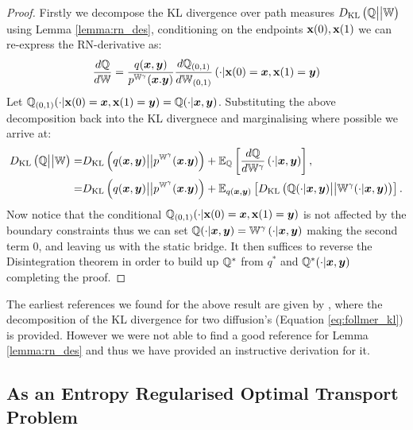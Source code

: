 \documentclass[a4paper,12pt,twoside,openright]{report}
\theoremstyle{definition}
\begin{document}
\begin{proof}
Firstly we decompose the KL divergence over path measures $D_{\mathrm{KL}}\left({\mathbb{Q}} \big|\big| \mathbb{W}\right)$ using Lemma \ref{lemma:rn_des}, conditioning on the endpoints ${\mathbf{x}}(0), {\mathbf{x}}(1)$ we can re-express the RN-derivative as:
\begin{align}
    \frac{d{\mathbb{Q}}}{d\mathbb{W}} = \frac{q({\bm{x}}, {\bm{y}})}{p^{\mathbb{W}^{\gamma}}({\bm{x}}. {\bm{y}})}\frac{d{\mathbb{Q}}_{(0,1)}}{d\mathbb{W}_{(0,1)}}\left(\cdot | {\mathbf{x}}(0) ={\bm{x}}, {\mathbf{x}}(1) ={\bm{y}}\right)
\end{align}
Let ${\mathbb{Q}}_{(0,1)}(\cdot |  {\mathbf{x}}(0) ={\bm{x}}, {\mathbf{x}}(1) ={\bm{y}}) = {\mathbb{Q}}(\cdot |  {\bm{x}},{\bm{y}})$. Substituting the above decomposition back into the KL divergnece and marginalising where possible we arrive at: 
\begin{align} \label{eq:follmer_kl}
    D_{\mathrm{KL}}\left({\mathbb{Q}} \big|\big| \mathbb{W}\right) =&  D_{\mathrm{KL}}\left(q({\bm{x}}, {\bm{y}}) \big|\big| p^{\mathbb{W}^{\gamma}}({\bm{x}}. {\bm{y}}) \right)  + \mathbb{E}_{{\mathbb{Q}}}\left[\frac{d{\mathbb{Q}}}{d\mathbb{W}^\gamma}\left(\cdot | {\bm{x}}, {\bm{y}}\right)\right], \nonumber \\
    =&  D_{\mathrm{KL}}\left(q({\bm{x}}, {\bm{y}}) \big|\big| p^{\mathbb{W}^{\gamma}}({\bm{x}}. {\bm{y}}) \right)  + \mathbb{E}_{q({\bm{x}},{\bm{y}})}\left[D_{\mathrm{KL}}\left({\mathbb{Q}}(\cdot |  {\bm{x}},{\bm{y}})\big|\big|\mathbb{W}^{\gamma}(\cdot |  {\bm{x}},{\bm{y}})\right)\right].
\end{align}
Now notice that the conditional ${\mathbb{Q}}_{(0,1)}(\cdot |  {\mathbf{x}}(0) ={\bm{x}}, {\mathbf{x}}(1) ={\bm{y}})$ is not affected by the boundary constraints thus we can set ${\mathbb{Q}}(\cdot | {\bm{x}},{\bm{y}}) = \mathbb{W}^\gamma\left(\cdot | {\bm{x}}, {\bm{y}}\right)$ making the second term 0, and leaving us with the static bridge. It then suffices to reverse the Disintegration theorem in order to build up ${\mathbb{Q}}^{*}$ from $q^{*}$ and ${\mathbb{Q}}^{*}(\cdot | {\bm{x}},{\bm{y}})$ completing the proof.
\end{proof}

The earliest references we found for the above result are given by \cite{follmer1988random}, where the decomposition of the KL divergence for two diffusion's (Equation \ref{eq:follmer_kl}) is provided. However we were not able to find a good reference for Lemma \ref{lemma:rn_des} and thus we have provided an instructive derivation for it.
\subsection{As an Entropy Regularised Optimal Transport Problem}
\end{document}
